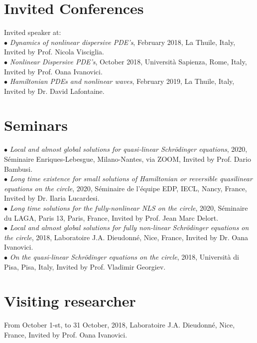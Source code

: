 \documentclass[margin,line,pifont,palatino,courier]{res}
\begin{document}
\begin{resume}
\section{\sc Invited Conferences}

Invited speaker at:\\
 $\bullet$ \emph{Dynamics of nonlinear dispersive PDE's}, February 2018, La Thuile, Italy, Invited by Prof. Nicola Visciglia.\\
$\bullet$  \emph{Nonlinear Dispersive PDE's}, October 2018, Universit\`a Sapienza, Rome, Italy, Invited by Prof. Oana Ivanovici.\\
  $\bullet$ \emph{Hamiltonian PDEs and nonlinear waves}, February 2019, La Thuile, Italy, Invited by Dr. David Lafontaine.\\



\section{\sc Seminars}
$\bullet$ \emph{Local and almost global solutions for quasi-linear Schr\"odinger equations}, 2020, S\'eminaire Enriques-Lebesgue, Milano-Nantes, via ZOOM, Invited by Prof. Dario Bambusi. \\
$\bullet$ \emph{Long time existence for small solutions of Hamiltonian or reversible quasilinear equations on the circle}, 2020, S\'eminaire de l'\'equipe EDP, IECL, Nancy, France, Invited by Dr. Ilaria Lucardesi.\\
$\bullet$ \emph{Long time solutions for the fully-nonlinear NLS on the circle}, 2020, S\'eminaire du LAGA,  Paris 13, Paris, France, Invited by  Prof. Jean Marc Delort.\\
$\bullet$ \emph{Local and almost global solutions for fully non-linear Schr\"odinger equations on the circle}, 2018, Laboratoire  J.A. Dieudonn\'e, Nice, France,  Invited by Dr. Oana Ivanovici.\\
$\bullet$ \emph{On the quasi-linear Schr\"odinger equations on the circle}, 2018, Universit\`a di Pisa, Pisa, Italy,  Invited by Prof. Vladimir Georgiev.\\

\section{\sc Visiting researcher}

From October 1-st, to 31 October, 2018, Laboratoire  J.A. Dieudonn\'e, Nice, France,  Invited by Prof. Oana Ivanovici.


\end{resume}
\end{document}
